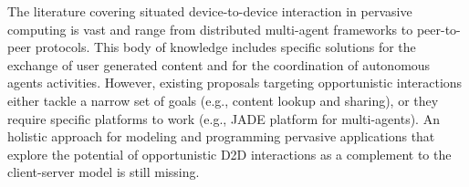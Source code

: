 The literature covering situated device-to-device interaction in pervasive computing is vast and range from distributed multi-agent frameworks to peer-to-peer protocols. This body of knowledge includes specific solutions for the exchange of user generated content and for the coordination of autonomous agents activities. However, existing proposals targeting opportunistic interactions either tackle a narrow set of goals (e.g., content lookup and sharing), or they require specific platforms to work (e.g., JADE platform for multi-agents). An holistic approach for modeling and programming pervasive applications that explore the potential of opportunistic D2D interactions as a complement to the client-server model is still missing.









